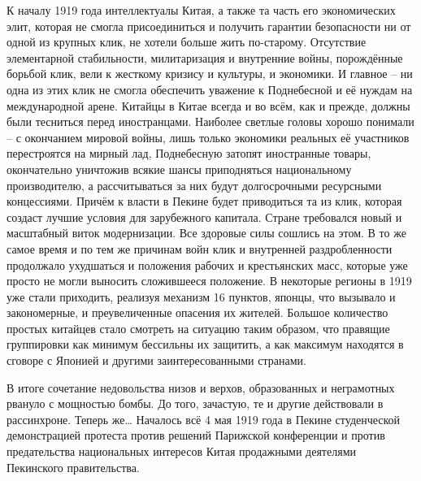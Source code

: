 К началу 1919 года интеллектуалы Китая, а также та часть его экономических элит, которая не смогла присоединиться и получить гарантии безопасности ни от одной из крупных клик, не хотели больше жить по-старому. Отсутствие элементарной стабильности, милитаризация и внутренние войны, порождённые борьбой клик, вели к жесткому кризису и культуры, и экономики. И главное – ни одна из этих клик не смогла обеспечить уважение к Поднебесной и её нуждам на международной арене. Китайцы в Китае всегда и во всём, как и прежде, должны были тесниться перед иностранцами. Наиболее светлые головы хорошо понимали – с окончанием мировой войны, лишь только экономики реальных её участников перестроятся на мирный лад, Поднебесную затопят иностранные товары, окончательно уничтожив всякие шансы приподняться национальному производителю, а рассчитываться за них будут долгосрочными ресурсными концессиями. Причём к власти в Пекине будет приводиться та из клик, которая создаст лучшие условия для зарубежного капитала. Стране требовался новый и масштабный виток модернизации. Все здоровые силы сошлись на этом. В то же самое время и по тем же причинам войн клик и внутренней раздробленности продолжало ухудшаться и положения рабочих и крестьянских масс, которые уже просто не могли выносить сложившееся положение. В некоторые регионы в 1919 уже стали приходить, реализуя механизм 16 пунктов, японцы, что вызывало и закономерные, и преувеличенные опасения их жителей. Большое количество простых китайцев стало смотреть на ситуацию таким образом, что правящие группировки как минимум бессильны их защитить, а как максимум находятся в сговоре с Японией и другими заинтересованными странами.

В итоге сочетание недовольства низов и верхов, образованных и неграмотных рвануло с мощностью бомбы. До того, зачастую, те и другие действовали в рассинхроне. Теперь же… Началось всё 4 мая 1919 года в Пекине студенческой демонстрацией протеста против решений Парижской конференции и против предательства национальных интересов Китая продажными деятелями Пекинского правительства. 

